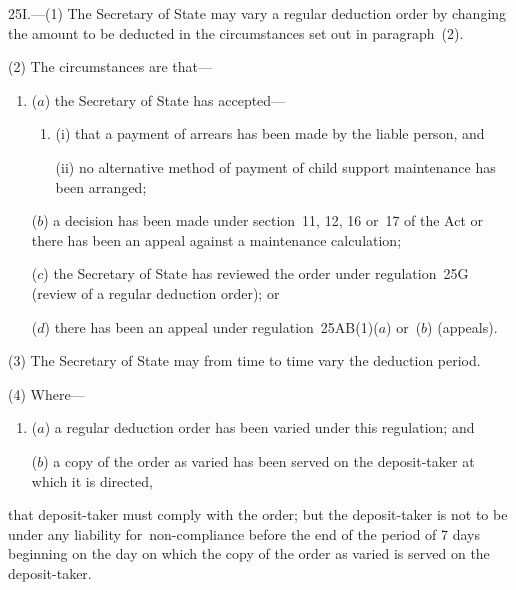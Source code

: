 \documentclass[12pt,a4paper]{article}
\begin{document}
25I.---(1)  The 
Secretary of State  %
may vary a regular deduction order by changing the amount to be deducted in the circumstances set out in paragraph~(2).

(2) The circumstances are that—
\begin{enumerate}\item[]
($a$) the 
Secretary of State  %
has accepted—
\begin{enumerate}\item[]
(i) that a payment of arrears has been made by the liable person, and

(ii) no alternative method of payment of child support maintenance has been arranged;
\end{enumerate}

($b$) a decision has been made under section~11, 12, 16 or~17 of the Act or there has been an appeal against a maintenance calculation;

($c$) the 
Secretary of State  %
has reviewed the order under regulation~25G (review of a regular deduction order); or

($d$) there has been an appeal under regulation~25AB(1)($a$)  or~($b$)  (appeals).
\end{enumerate}

(3) The 
Secretary of State  %
may from time to time vary the deduction period.

(4) Where—
\begin{enumerate}\item[]
($a$) a regular deduction order has been varied under this regulation; and

($b$) a copy of the order as varied has been served on the deposit-taker at which it is directed,
\end{enumerate}
that deposit-taker must comply with the order; but the deposit-taker is not to be under any liability for~non-compliance before the end of the period of 7 days beginning on the day on which the copy of the order as varied is served on the deposit-taker.

\end{document}
